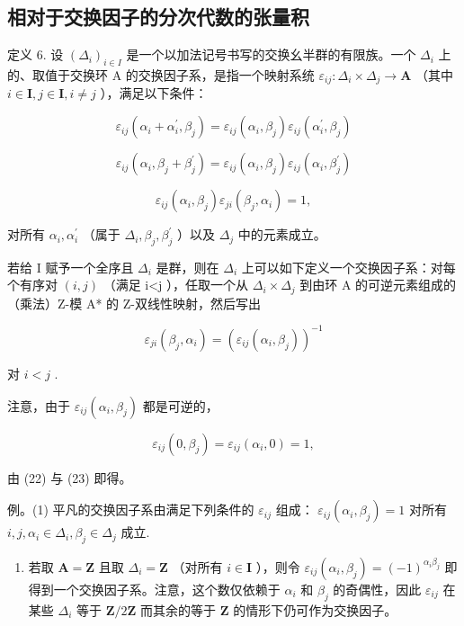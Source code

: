 \subsection{相对于交换因子的分次代数的张量积}

定义 6. 设 \((\Delta_{i})_{i\in I}\) 是一个以加法记号书写的交换幺半群的有限族。一个 \(\Delta_{i}\) 上的、取值于交换环 A 的交换因子系，是指一个映射系统 \(\varepsilon_{ij}:\Delta_i\times \Delta_j\to \mathbf{A}\) （其中 \(i\in \mathbf{I}, j\in \mathbf{I}, i\neq j\) ），满足以下条件：

\[
\varepsilon_ {i j} \left(\alpha_ {i} + \alpha_ {i} ^ {\prime}, \beta_ {j}\right) = \varepsilon_ {i j} \left(\alpha_ {i}, \beta_ {j}\right) \varepsilon_ {i j} \left(\alpha_ {i} ^ {\prime}, \beta_ {j}\right)\tag{22}
\]

\[
\varepsilon_ {i j} \left(\alpha_ {i}, \beta_ {j} + \beta_ {j} ^ {\prime}\right) = \varepsilon_ {i j} \left(\alpha_ {i}, \beta_ {j}\right) \varepsilon_ {i j} \left(\alpha_ {i}, \beta_ {j} ^ {\prime}\right)\tag{23}
\]

\[
\varepsilon_ {i j} (\alpha_ {i}, \beta_ {j}) \varepsilon_ {j i} (\beta_ {j}, \alpha_ {i}) = 1,\tag{24}
\]

对所有 \(\alpha_{i},\alpha_{i}^{\prime}\) （属于 \(\Delta_{i},\beta_{j},\beta_{j}^{\prime}\) ）以及 \(\Delta_j\) 中的元素成立。

若给 I 赋予一个全序且 \(\Delta_{i}\) 是群，则在 \(\Delta_{i}\) 上可以如下定义一个交换因子系：对每个有序对 \((i,j)\) （满足 i\textless j ），任取一个从 \(\Delta_{i}\times\Delta_{j}\) 到由环 A 的可逆元素组成的（乘法）Z-模 A* 的 Z-双线性映射，然后写出

\[
\varepsilon_ {j i} (\beta_ {j}, \alpha_ {i}) = (\varepsilon_ {i j} (\alpha_ {i}, \beta_ {j})) ^ {- 1}
\]

对 \(i < j\) .

注意，由于 \(\varepsilon_{ij}(\alpha_{i},\beta_{j})\) 都是可逆的，

\[
\varepsilon_ {i j} (0, \beta_ {j}) = \varepsilon_ {i j} (\alpha_ {i}, 0) = 1,
\]

由 (22) 与 (23) 即得。

例。(1) 平凡的交换因子系由满足下列条件的 \(\varepsilon_{ij}\) 组成： \(\varepsilon_{ij}(\alpha_i, \beta_j) = 1\) 对所有 \(i, j, \alpha_i \in \Delta_i, \beta_j \in \Delta_j\) 成立.

\begin{enumerate}
\def\labelenumi{(\arabic{enumi})}
\setcounter{enumi}{1}
\tightlist
\item
  若取 \(\mathbf{A} = \mathbf{Z}\) 且取 \(\Delta_{i} = \mathbf{Z}\) （对所有 \(i \in \mathbf{I}\) ），则令 \(\varepsilon_{ij}(\alpha_i, \beta_j) = (-1)^{\alpha_i\beta_j}\) 即得到一个交换因子系。注意，这个数仅依赖于 \(\alpha_{i}\) 和 \(\beta_{j}\) 的奇偶性，因此 \(\varepsilon_{ij}\) 在某些 \(\Delta_{i}\) 等于 \(\mathbf{Z}/2\mathbf{Z}\) 而其余的等于 \(\mathbf{Z}\) 的情形下仍可作为交换因子。
\end{enumerate}

